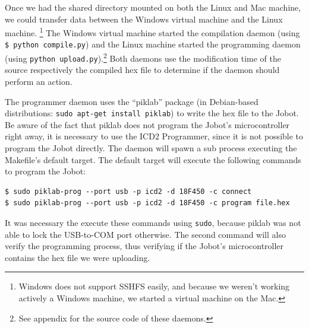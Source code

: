\documentclass[a4paper,10pt]{article} %
\begin{document}
Once we had the shared directory mounted on both the Linux and Mac machine, we
could transfer data between the Windows virtual machine and the Linux machine.
\footnote{Windows does not support SSHFS easily, and because we weren't working
actively a Windows machine, we started a virtual machine on the Mac.} The
Windows virtual machine started the compilation daemon (using \texttt{\$ python
compile.py}) and the Linux machine started the programming daemon (using
\texttt{python upload.py}).\footnote{See appendix for the source code of these
daemons.} Both daemons use the modification time of the source respectively the
compiled hex file to determine if the daemon should perform an action.

The programmer daemon uses the ``piklab'' package (in Debian-based
distributions: \texttt{sudo apt-get install piklab}) to write the hex file to
the Jobot. Be aware of the fact that piklab does not program the Jobot's
microcontroller right away, it is necessary to use the ICD2 Programmer, since
it is not possible to program the Jobot directly. The daemon will spawn a
sub process executing the Makefile's default target. The default target will
execute the following commands to program the Jobot:

\begin{verbatim}
$ sudo piklab-prog --port usb -p icd2 -d 18F450 -c connect
$ sudo piklab-prog --port usb -p icd2 -d 18F450 -c program file.hex
\end{verbatim}

It was necessary the execute these commands using \texttt{sudo}, because
piklab was not able to lock the USB-to-COM port otherwise. The second command
will also verify the programming process, thus verifying if the Jobot's
microcontroller contains the hex file we were uploading.
\end{document}
